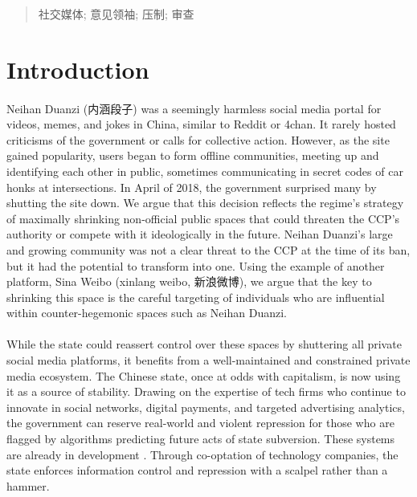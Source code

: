 \documentclass[12pt]{article}
\begin{document}
\begin{CJK*}{UTF8}{gbsn}
{\begin{abstract}
 社交媒体; 意见领袖; 压制; 审查
\end{abstract}
}
\newpage

\section*{Introduction}

\paragraph{} Neihan Duanzi (内涵段子) was a seemingly harmless social media portal for videos, memes, and jokes in China, similar to Reddit or 4chan. It rarely hosted criticisms of the government or calls for collective action. However, as the site gained popularity, users began to form offline communities, meeting up and identifying each other in public, sometimes communicating in secret codes of car honks at intersections. In April of 2018, the government surprised many by shutting the site down. We argue that this decision reflects the regime's strategy of maximally shrinking non-official public spaces that could threaten the CCP's authority or compete with it ideologically in the future. Neihan Duanzi's large and growing community was not a clear threat to the CCP at the time of its ban, but it had the potential to transform into one. Using the example of another platform, Sina Weibo (xinlang weibo, 新浪微博), we argue that the key to shrinking this space is the careful targeting of individuals who are influential within counter-hegemonic spaces such as Neihan Duanzi.

\paragraph{} While the state could reassert control over these spaces by shuttering all private social media platforms, it benefits from a well-maintained and constrained private media ecosystem. The Chinese state, once at odds with capitalism, is now using it as a source of stability. Drawing on the expertise of tech firms who continue to innovate in social networks, digital payments, and targeted advertising analytics, the government can reserve real-world and violent repression for those who are flagged by algorithms predicting future acts of state subversion. These systems are already in development \citep{merics2017social,yang2017social}. Through co-optation of technology companies, the state enforces information control and repression with a scalpel rather than a hammer. 


\end{CJK*}
\end{document}
